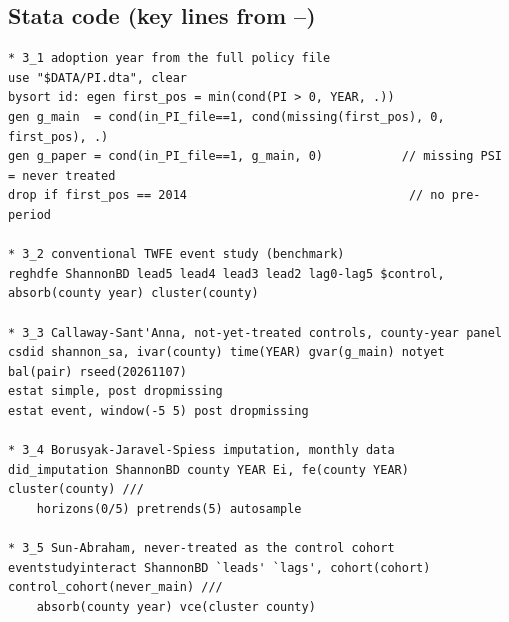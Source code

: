 \documentclass[11pt]{article}
\begin{document}
\subsection*{Stata code (key lines from --)}
\begin{lstlisting}
* 3_1 adoption year from the full policy file
use "$DATA/PI.dta", clear
bysort id: egen first_pos = min(cond(PI > 0, YEAR, .))
gen g_main  = cond(in_PI_file==1, cond(missing(first_pos), 0, first_pos), .)
gen g_paper = cond(in_PI_file==1, g_main, 0)           // missing PSI = never treated
drop if first_pos == 2014                               // no pre-period

* 3_2 conventional TWFE event study (benchmark)
reghdfe ShannonBD lead5 lead4 lead3 lead2 lag0-lag5 $control, absorb(county year) cluster(county)

* 3_3 Callaway-Sant'Anna, not-yet-treated controls, county-year panel
csdid shannon_sa, ivar(county) time(YEAR) gvar(g_main) notyet bal(pair) rseed(20261107)
estat simple, post dropmissing
estat event, window(-5 5) post dropmissing

* 3_4 Borusyak-Jaravel-Spiess imputation, monthly data
did_imputation ShannonBD county YEAR Ei, fe(county YEAR) cluster(county) ///
    horizons(0/5) pretrends(5) autosample

* 3_5 Sun-Abraham, never-treated as the control cohort
eventstudyinteract ShannonBD `leads' `lags', cohort(cohort) control_cohort(never_main) ///
    absorb(county year) vce(cluster county)
\end{lstlisting}
\end{document}
